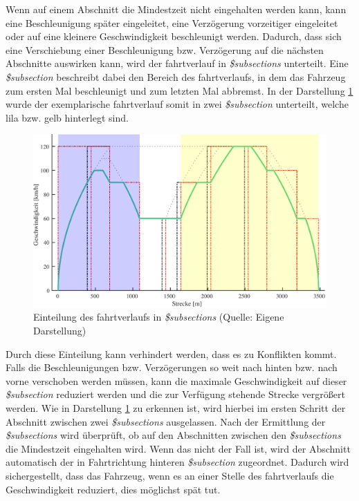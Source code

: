 Wenn auf einem Abschnitt die Mindestzeit nicht eingehalten werden kann, kann eine Beschleunigung später eingeleitet, eine Verzögerung vorzeitiger eingeleitet oder auf eine kleinere Geschwindigkeit beschleunigt werden. Dadurch, dass sich eine Verschiebung einer Beschleunigung bzw. Verzögerung auf die nächsten Abschnitte auswirken kann, wird der \Gls{fahrtverlauf} in \textit{\$subsections} unterteilt. Eine \textit{\$subsection} beschreibt dabei den Bereich des \Gls{fahrtverlauf}s, in dem das Fahrzeug zum ersten Mal beschleunigt und zum letzten Mal abbremst. In der Darstellung \ref{fig:it7} wurde der exemplarische \Gls{fahrtverlauf} somit in zwei \textit{\$subsection} unterteilt, welche lila bzw. gelb hinterlegt sind.
\begin{figure}
\includegraphics[width=\linewidth]{../images/matlab/it7.pdf}
\caption[Einteilung des \Gls{fahrtverlauf}s in \textit{\$subsections}]{Einteilung des \Gls{fahrtverlauf}s in \textit{\$subsections} (Quelle: Eigene Darstellung)}
\label{fig:it7}
\end{figure}
Durch diese Einteilung kann verhindert werden, dass es zu Konflikten kommt. Falls die Beschleunigungen bzw. Verzögerungen so weit nach hinten bzw. nach vorne verschoben werden müssen, kann die maximale Geschwindigkeit auf dieser \textit{\$subsection} reduziert werden und die zur Verfügung stehende Strecke vergrößert werden. Wie in Darstellung \ref{fig:it7} zu erkennen ist, wird hierbei im ersten Schritt der Abschnitt zwischen zwei \textit{\$subsections} ausgelassen. Nach der Ermittlung der \textit{\$subsections} wird überprüft, ob auf den Abschnitten zwischen den \textit{\$subsections} die Mindestzeit eingehalten wird. Wenn das nicht der Fall ist, wird der Abschnitt automatisch der in Fahrtrichtung hinteren \textit{\$subsection} zugeordnet. Dadurch wird sichergestellt, dass das Fahrzeug, wenn es an einer Stelle des \Gls{fahrtverlauf}s die Geschwindigkeit reduziert, dies möglichst spät tut.


